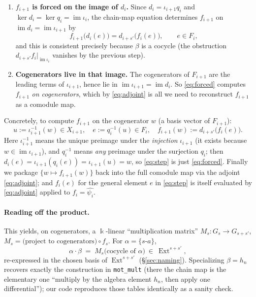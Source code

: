 \documentclass[11pt]{article}
\newcommand{\Ext}{\operatorname{Ext}}
\newcommand{\im}{\operatorname{im}}
\newcommand{\kk}{\Bbbk}
\theoremstyle{definition}
\begin{document}
\begin{enumerate}[leftmargin=*]
\item \textbf{$f_{i+1}$ is forced on the image of $d_i$.}
  Since $d_i=\iota_{i+1}q_i$ and $\ker d_i=\ker q_i=\im\iota_i$, the chain-map
  equation determines $f_{i+1}$ on $\im d_i=\im\iota_{i+1}$ by
  \begin{equation}\label{eq:forced}
    f_{i+1}\bigl(d_i(e)\bigr)=d_{i+s'}\bigl(f_i(e)\bigr),
    \qquad e\in F_i,
  \end{equation}
  and this is consistent precisely because $\beta$ is a cocycle (the obstruction
  $d_{i+s'}f_i|_{\im\iota_i}$ vanishes by the previous step).
\item \textbf{Cogenerators live in that image.} The cogenerators of $F_{i+1}$ are
  the leading terms of $\iota_{i+1}$, hence lie in $\im\iota_{i+1}=\im d_i$. So
  \eqref{eq:forced} computes $f_{i+1}$ \emph{on cogenerators}, which by
  \eqref{eq:adjoint} is all we need to reconstruct $f_{i+1}$ as a comodule map.
\end{enumerate}
Concretely, to compute $f_{i+1}$ on the cogenerator $w$ (a basis vector of
$F_{i+1}$):
\begin{equation}\label{eq:step}
  u:=\iota_{i+1}^{-1}(w)\in X_{i+1},\quad
  e:=q_i^{-1}(u)\in F_i,\quad
  f_{i+1}(w):=d_{i+s'}\bigl(f_i(e)\bigr).
\end{equation}
Here $\iota_{i+1}^{-1}$ means the unique preimage under the \emph{injection}
$\iota_{i+1}$ (it exists because $w\in\im\iota_{i+1}$), and $q_i^{-1}$ means
\emph{any} preimage under the surjection $q_i$; then
$d_i(e)=\iota_{i+1}(q_i(e))=\iota_{i+1}(u)=w$, so \eqref{eq:step} is just
\eqref{eq:forced}. Finally we package $\{w\mapsto f_{i+1}(w)\}$ back into the full
comodule map via the adjoint \eqref{eq:adjoint}; and $f_i(e)$ for the general
element $e$ in \eqref{eq:step} is itself evaluated by \eqref{eq:adjoint} applied to
$f_i=\widehat{\psi_i}$.

\paragraph{Reading off the product.}
This yields, on cogenerators, a $\kk$-linear ``multiplication matrix''
$M_s\colon G_s\to G_{s+s'}$, $M_s=\bigl(\text{project to cogenerators}\bigr)\circ
f_s$. For $\alpha=\{s\text{-}a\}$,
\[
  \alpha\cdot\beta \;=\; M_s\bigl(\text{cocycle of }\alpha\bigr)\ \in\ \Ext^{s+s'},
\]
re-expressed in the chosen basis of $\Ext^{s+s'}$ (\S\ref{sec:naming}). Specializing
$\beta=h_n$ recovers exactly the construction in \texttt{mot\_mult} (there the
chain map is the elementary one ``multiply by the algebra element $h_n$, then apply
one differential''); our code reproduces those tables identically as a sanity check.
\end{document}
